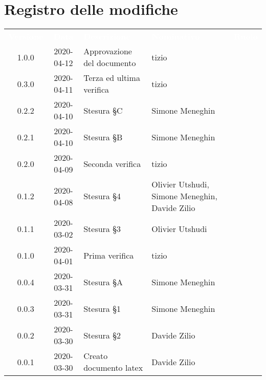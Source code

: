 \section*{Registro delle modifiche}
{
	\centering
	\begin{longtable}{ c c  C{4cm}  C{3.5cm}  C{3.5cm} }
		\textcolor{white}{\textbf{Versione}} & \textcolor{white}{\textbf{Data}} & \textcolor{white}{\textbf{Descrizione}} & \textcolor{white}{\textbf{Nominativo}} & \textcolor{white}{\textbf{Ruolo}}\\		
		1.0.0 & 2020-04-12 & Approvazione del documento & tizio &\RdP{} \\
		0.3.0 & 2020-04-11 & Terza ed ultima verifica & tizio &\ver{} \\
		0.2.2 & 2020-04-10 & Stesura \S C & Simone Meneghin &\prog{} \\
		0.2.1 & 2020-04-10 & Stesura \S B & Simone Meneghin &\prog{} \\
		0.2.0 & 2020-04-09 & Seconda verifica & tizio &\ver{} \\
		0.1.2 & 2020-04-08 & Stesura \S 4 & Olivier Utshudi, Simone Meneghin, Davide Zilio &\prog{} \\
		0.1.1 & 2020-03-02 & Stesura \S 3 & Olivier Utshudi &\prog{} \\
		0.1.0 & 2020-04-01 & Prima verifica & tizio &\ver{} \\
		0.0.4 & 2020-03-31 & Stesura \S A & Simone Meneghin &\prog{} \\
		0.0.3 & 2020-03-31 & Stesura \S 1 & Simone Meneghin &\prog{} \\
		0.0.2 & 2020-03-30 & Stesura \S 2 & Davide Zilio &\prog{} \\
		0.0.1 & 2020-03-30 & Creato documento latex & Davide Zilio &\prog{}\\		
		
	\end{longtable}

}